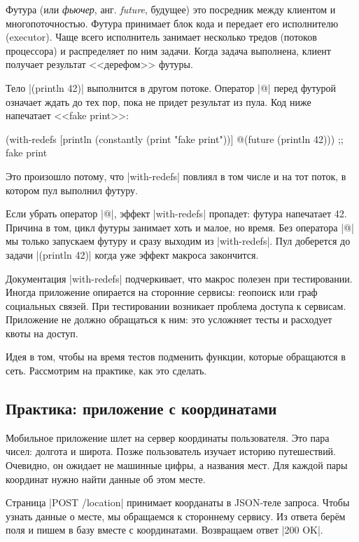Футура (или \emph{фьючер}, анг. \emph{future}, будущее) это посредник между
клиентом и многопоточностью. Футура принимает блок кода и передает его
исполнителю (executor). Чаще всего исполнитель занимает несколько тредов
(потоков процессора) и распределяет по ним задачи. Когда задача выполнена,
клиент получает результат <<дерефом>> футуры.

Тело \spverb|(println 42)| выполнится в другом потоке. Оператор \spverb|@|
перед футурой означает ждать до тех пор, пока не придет результат из пула. Код
ниже напечатает <<fake print>>:

\begin{english}
  \begin{clojure}
(with-redefs
  [println (constantly (print "fake print"))]
  @(future (println 42)))
;; fake print
  \end{clojure}
\end{english}

Это произошло потому, что \spverb|with-redefs| повлиял в том числе и на тот
поток, в котором пул выполнил футуру.

Если убрать оператор \spverb|@|, эффект \spverb|with-redefs| пропадет: футура
напечатает 42. Причина в том, цикл футуры занимает хоть и малое, но время. Без
оператора \spverb|@| мы только запускаем футуру и сразу выходим из
\spverb|with-redefs|. Пул доберется до задачи \spverb|(println 42)| когда уже
эффект макроса закончится.

Документация \spverb|with-redefs| подчеркивает, что макрос полезен при
тестировании. Иногда приложение опирается на сторонние сервисы: геопоиск или
граф социальных связей. При тестировании возникает проблема доступа к
сервисам. Приложение не должно обращаться к ним: это усложняет тесты и расходует
квоты на доступ.

Идея в том, чтобы на время тестов подменить функции, которые обращаются в
сеть. Рассмотрим на практике, как это сделать.

\subsection{Практика: приложение с координатами}

Мобильное приложение шлет на сервер координаты пользователя. Это пара чисел:
долгота и широта. Позже пользователь изучает историю путешествий. Очевидно, он
ожидает не машинные цифры, а названия мест. Для каждой пары координат нужно
найти данные об этом месте.

Страница \spverb|POST /location| принимает коорданаты в JSON-теле запроса. Чтобы
узнать данные о месте, мы обращаемся к стороннему сервису. Из ответа бер\"{е}м
поля и пишем в базу вместе с координатами. Возвращаем ответ \spverb|200 OK|.

